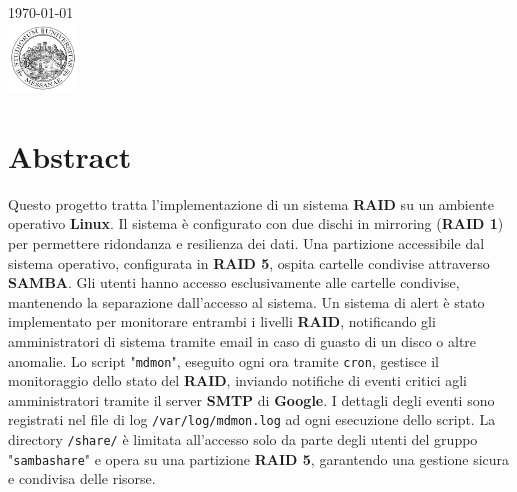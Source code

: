 \documentclass[11pt]{article}
\begin{document}
\begin{titlepage}


    {\large \today}\\[2cm] %


    \includegraphics[width=70px, keepaspectratio]{"unime.png"}\\[1cm] %


    \vfill %

\end{titlepage}

\tableofcontents
\pagebreak

\section{Abstract}
Questo progetto tratta l'implementazione di un sistema \textbf{RAID} su un ambiente operativo \textbf{Linux}. Il sistema è configurato con due dischi in mirroring (\textbf{RAID 1}) per permettere ridondanza e resilienza dei dati. Una partizione accessibile dal sistema operativo, configurata in \textbf{RAID 5}, ospita cartelle condivise attraverso \textbf{SAMBA}. Gli utenti hanno accesso esclusivamente alle cartelle condivise, mantenendo la separazione dall'accesso al sistema. Un sistema di alert è stato implementato per monitorare entrambi i livelli \textbf{RAID}, notificando gli amministratori di sistema tramite email in caso di guasto di un disco o altre anomalie. Lo script "\texttt{mdmon}", eseguito ogni ora tramite \texttt{cron}, gestisce il monitoraggio dello stato del \textbf{RAID}, inviando notifiche di eventi critici agli amministratori tramite il server \textbf{SMTP} di \textbf{Google}. I dettagli degli eventi sono registrati nel file di log \texttt{/var/log/mdmon.log} ad ogni esecuzione dello script. La directory \texttt{/share/} è limitata all'accesso solo da parte degli utenti del gruppo "\texttt{sambashare}" e opera su una partizione \textbf{RAID 5}, garantendo una gestione sicura e condivisa delle risorse.
\end{document}
